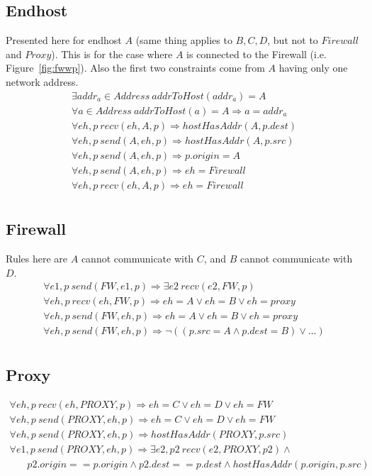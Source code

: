 \documentclass[11pt]{article}
\begin{document}
\subsection{Endhost}
Presented here for endhost $A$ (same thing applies to $B, C, D$, but not to $Firewall$ and $Proxy$). This is for the
case where $A$ is connected to the Firewall (i.e. Figure~\ref{fig:fwwp}). Also the first two constraints come from $A$
having only one network address.
\begin{gather*}
\exists addr_a\in Address\ addrToHost(addr_a) = A\\
\forall a\in Address\ addrToHost(a) = A \Rightarrow a = addr_a\\
\forall eh, p\ recv(eh, A, p) \Rightarrow hostHasAddr(A, p.dest)\\
\forall eh, p\ send(A, eh, p) \Rightarrow hostHasAddr(A, p.src)\\
\forall eh, p\ send(A, eh, p) \Rightarrow p.origin = A\\
\forall eh, p\ send(A, eh, p) \Rightarrow eh = Firewall\\
\forall eh, p\ recv(eh, A, p) \Rightarrow eh = Firewall\\
\end{gather*}

\subsection{Firewall}
Rules here are $A$ cannot communicate with $C$, and $B$ cannot communicate with $D$.
\begin{gather*}
\forall e1, p\ send(FW, e1, p)\Rightarrow \exists e2\ recv(e2, FW, p)\\
\forall eh, p\ recv(eh, FW, p)\Rightarrow eh = A \lor eh = B \lor eh = proxy\\
\forall eh, p\ send(FW, eh, p)\Rightarrow eh = A \lor eh = B \lor eh = proxy\\
\forall eh, p\ send(FW, eh, p)\Rightarrow \neg((p.src = A \land p.dest = B) \lor\ldots)\\
\end{gather*}

\subsection{Proxy}
\begin{gather*}
\forall eh, p\ recv(eh, PROXY, p)\Rightarrow eh = C \lor eh = D \lor eh = FW\\
\forall eh, p\ send(PROXY, eh, p)\Rightarrow eh = C \lor eh = D \lor eh = FW\\
\forall eh, p\ send(PROXY, eh, p)\Rightarrow hostHasAddr(PROXY, p.src)\\
\forall e1, p\ send(PROXY, eh, p)\Rightarrow \exists e2, p2\ recv(e2, PROXY, p2) \land\\
\ \ \ \ \ \ \ \ p2.origin == p.origin\land p2.dest== p.dest\land hostHasAddr(p.origin, p.src)\\
\end{gather*}
\end{document}

